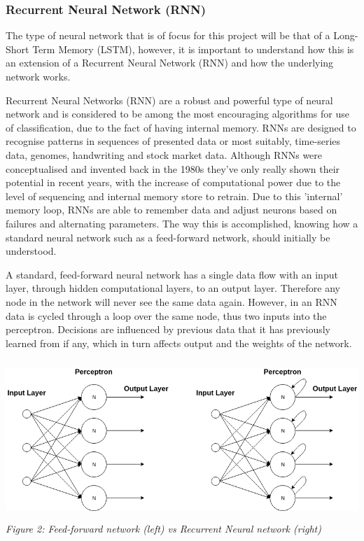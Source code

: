 \documentclass[oneside, 10pt]{article}
\begin{document}
			\subsubsection{Recurrent Neural Network (RNN)}\label{types}
			The type of neural network that is of focus for this project will be that of a Long-Short Term Memory (LSTM), however, it is important to understand how this is an extension of a Recurrent Neural Network (RNN) and how the underlying network works.
			
			Recurrent Neural Networks (RNN) are a robust and powerful type of neural network and is considered to be among the most encouraging algorithms for use of classification, due to the fact of having internal memory. RNNs are designed to recognise patterns in sequences of presented data or most suitably, time-series data, genomes, handwriting and stock market data. Although RNNs were conceptualised and invented back in the 1980s \cite{17} they've only really shown their potential in recent years, with the increase of computational power due to the level of sequencing and internal memory store to retrain.
			Due to this 'internal' memory loop, RNNs are able to remember data and adjust neurons based on failures and alternating parameters. The way this is accomplished, knowing how a standard neural network such as a feed-forward network, should initially be understood. \cite{18}
			
			A standard, feed-forward neural network has a single data flow with an input layer, through hidden computational layers, to an output layer. Therefore any node in the network will never see the same data again. However, in an RNN data is cycled through a loop over the same node, thus two inputs into the perceptron. Decisions are influenced by previous data that it has previously learned from if any, which in turn affects output and the weights of the network. \cite{19}
			
			\begin{center}
				\includegraphics[width=15cm,height=6cm]{images/rnn_ffn.png}
				\newline
				\textit{Figure 2: Feed-forward network (left) vs Recurrent Neural network (right)}
			\end{center}
		
\end{document}
